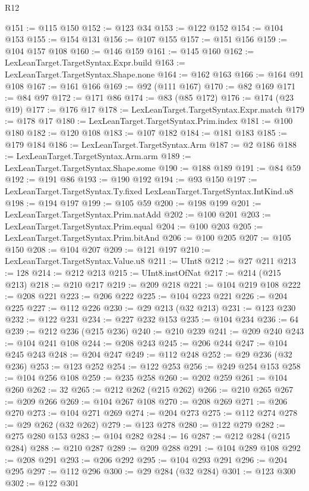 \begin{lexlean}{R12}
\begin{coremodule}
@151 := @115 @150
@152 := @123 @34
@153 := @122 @152
@154 := @104 @153
@155 := @154 @131
@156 := @107 @155
@157 := @151 @156
@159 := @104 @157 @108
@160 := @146 @159
@161 := @145 @160
@162 := LexLeanTarget.TargetSyntax.Expr.build
@163 := LexLeanTarget.TargetSyntax.Shape.none
@164 := @162 @163
@166 := @164 @91 @108
@167 := @161 @166
@169 := @92 (@111 @167)
@170 := @82 @169
@171 := @84 @97
@172 := @171 @86
@174 := @83 (@85 @172)
@176 := @174 (@23 @19)
@177 := @176 @17
@178 := LexLeanTarget.TargetSyntax.Expr.match
@179 := @178 @17
@180 := LexLeanTarget.TargetSyntax.Prim.index
@181 := @100 @180
@182 := @120 @108
@183 := @107 @182
@184 := @181 @183
@185 := @179 @184
@186 := LexLeanTarget.TargetSyntax.Arm
@187 := @2 @186
@188 := LexLeanTarget.TargetSyntax.Arm.arm
@189 := LexLeanTarget.TargetSyntax.Shape.some
@190 := @188 @189
@191 := @84 @59
@192 := @191 @86
@193 := @190 @192
@194 := @93 @150
@197 := LexLeanTarget.TargetSyntax.Ty.fixed LexLeanTarget.TargetSyntax.IntKind.u8
@198 := @194 @197
@199 := @105 @59
@200 := @198 @199
@201 := LexLeanTarget.TargetSyntax.Prim.natAdd
@202 := @100 @201
@203 := LexLeanTarget.TargetSyntax.Prim.equal
@204 := @100 @203
@205 := LexLeanTarget.TargetSyntax.Prim.bitAnd
@206 := @100 @205
@207 := @105 @150
@208 := @104 @207
@209 := @121 @197
@210 := LexLeanTarget.TargetSyntax.Value.u8
@211 := UInt8
@212 := @27 @211
@213 := 128
@214 := @212 @213
@215 := UInt8.instOfNat
@217 := @214 (@215 @213)
@218 := @210 @217
@219 := @209 @218
@221 := @104 @219 @108
@222 := @208 @221
@223 := @206 @222
@225 := @104 @223 @221
@226 := @204 @225
@227 := @112 @226
@230 := @29 @213 (@32 @213)
@231 := @123 @230
@232 := @122 @231
@234 := @227 @232 @153
@235 := @104 @234
@236 := 64
@239 := @212 @236 (@215 @236)
@240 := @210 @239
@241 := @209 @240
@243 := @104 @241 @108
@244 := @208 @243
@245 := @206 @244
@247 := @104 @245 @243
@248 := @204 @247
@249 := @112 @248
@252 := @29 @236 (@32 @236)
@253 := @123 @252
@254 := @122 @253
@256 := @249 @254 @153
@258 := @104 @256 @108
@259 := @235 @258
@260 := @202 @259
@261 := @104 @260
@262 := 32
@265 := @212 @262 (@215 @262)
@266 := @210 @265
@267 := @209 @266
@269 := @104 @267 @108
@270 := @208 @269
@271 := @206 @270
@273 := @104 @271 @269
@274 := @204 @273
@275 := @112 @274
@278 := @29 @262 (@32 @262)
@279 := @123 @278
@280 := @122 @279
@282 := @275 @280 @153
@283 := @104 @282
@284 := 16
@287 := @212 @284 (@215 @284)
@288 := @210 @287
@289 := @209 @288
@291 := @104 @289 @108
@292 := @208 @291
@293 := @206 @292
@295 := @104 @293 @291
@296 := @204 @295
@297 := @112 @296
@300 := @29 @284 (@32 @284)
@301 := @123 @300
@302 := @122 @301

\end{coremodule}
\end{lexlean}
